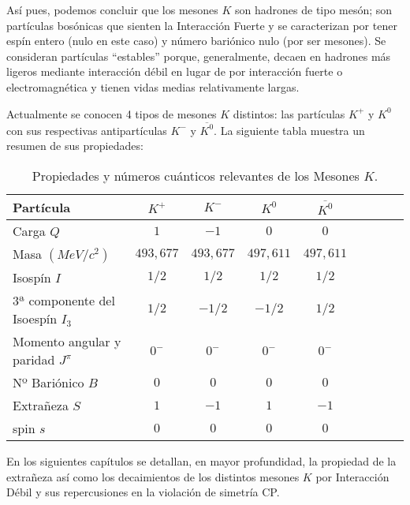 Así pues, podemos concluir que los mesones $K$ son hadrones de tipo mesón; son partículas bosónicas que sienten la Interacción Fuerte y se caracterizan por tener espín entero (nulo en este caso) y número bariónico nulo (por ser mesones). Se consideran partículas ``estables'' porque, generalmente, decaen en hadrones más ligeros mediante interacción débil en lugar de por interacción fuerte o electromagnética y tienen vidas medias relativamente largas.

Actualmente se conocen 4 tipos de mesones $K$ distintos: las partículas $K^+$ y $K^0$ con sus respectivas antipartículas $K^-$ y $\overline{K^0}$. La siguiente tabla muestra un resumen de sus propiedades:\\

\begin{table}[h]
	\centering
	\begin{tabular}{l*{7}{c}r}
\hline
Partícula & $K^+$ & $K^-$ & $K^0$ & $\overline{K^0}$ \\ 
\hline
Carga $Q$ & $1$ & $-1$ & $0$ & $0$\\
Masa $(MeV/c^2)$ & $493,677$ & $493,677$ & $497,611$ & $497,611$\\
Isospín $I$ & $1/2$ & $1/2$ & $1/2$ & $1/2$ \\
3ª componente del Isoespín $I_3$ & $1/2$ & $-1/2$ & $-1/2$ & $1/2$ \\
Momento angular y paridad $J^\pi$ & $0^-$ & $0^-$ & $0^-$ & $0^-$ \\
Nº Bariónico $B$ & $0$ & $0$ & $0$ & $0$\\
Extrañeza $S$ & $1$ & $-1$ & $1$ & $-1$\\
spin $s$ & $0$ & $0$ & $0$ & $0$\\ 
\hline
	\end{tabular}
\caption{Propiedades y números cuánticos relevantes de los Mesones $K$.\protect\footnotemark}
\label{tab:propiedades}
\end{table}


En los siguientes capítulos se detallan, en mayor profundidad, la propiedad de la extrañeza así como los decaimientos de los distintos mesones $K$ por Interacción Débil y sus repercusiones en la violación de simetría CP.




